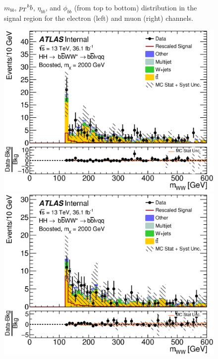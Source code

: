 \begin{figure}[h]
\begin{center}
\caption[Kinematic distributions in the signal region for the electron and muon channels]{$m_{bb}$, $\pt^bb$,  $\eta_{bb}$, and $\phi_{bb}$ (from top to bottom) distribution in the signal region for the electron (left) and muon (right) channels.}
\end{center}
\end{figure}

\newpage

\begin{figure}[h]
\begin{center}
\includegraphics[scale=0.33]{figures/kinplots/new/C_2tag_SR_elec_presel_met50_WWMass}
\includegraphics[scale=0.33]{figures/kinplots/new/C_2tag_SR_muon_presel_met50_WWMass}\\

\end{center}
\end{figure}
